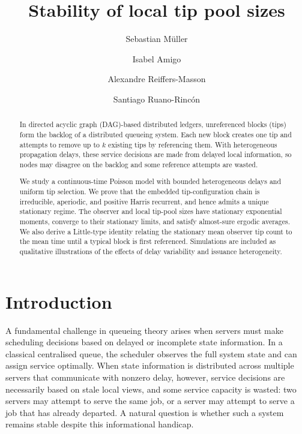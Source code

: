 \documentclass[a4paper,12pt,oneside,reqno]{amsart}
\title{Stability of local tip pool sizes}
\author{Sebastian M\"uller}
\author{Isabel Amigo}
\author{Alexandre Reiffers-Masson}
\author{Santiago Ruano-Rinc\'on}
\date{}
\newcommand{\1}{{\mathbf 1}}
\begin{document}
\begin{abstract}
In directed acyclic graph (DAG)-based distributed ledgers, unreferenced blocks (tips) form the backlog of a distributed queueing system. Each new block creates one tip and attempts to remove up to $k$ existing tips by referencing them. With heterogeneous propagation delays, these service decisions are made from delayed local information, so nodes may disagree on the backlog and some reference attempts are wasted.

We study a continuous-time Poisson model with bounded heterogeneous delays and uniform tip selection. We prove that the embedded tip-configuration chain is irreducible, aperiodic, and positive Harris recurrent, and hence admits a unique stationary regime. The observer and local tip-pool sizes have stationary exponential moments, converge to their stationary limits, and satisfy almost-sure ergodic averages. We also derive a Little-type identity relating the stationary mean observer tip count to the mean time until a typical block is first referenced. Simulations are included as qualitative illustrations of the effects of delay variability and issuance heterogeneity.
\end{abstract}


\maketitle

\section{Introduction}
A fundamental challenge in queueing theory arises when servers must make scheduling decisions based on delayed or incomplete state information. In a classical centralised queue, the scheduler observes the full system state and can assign service optimally. When state information is distributed across multiple servers that communicate with nonzero delay, however, service decisions are necessarily based on stale local views, and some service capacity is wasted: two servers may attempt to serve the same job, or a server may attempt to serve a job that has already departed. A natural question is whether such a system remains stable despite this informational handicap.
\end{document}

